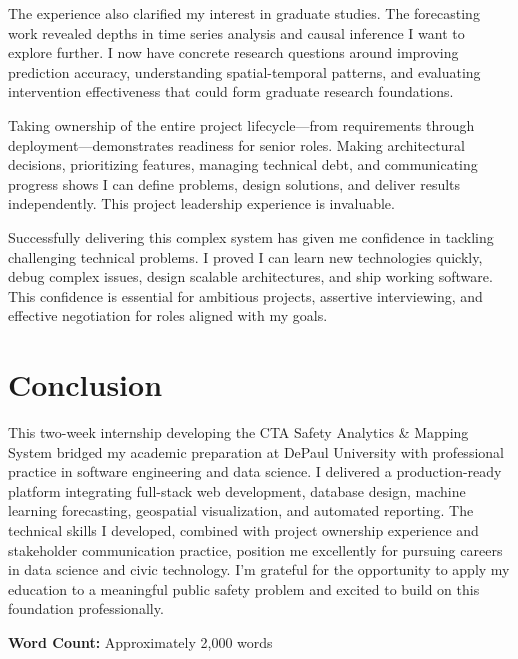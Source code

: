 \documentclass[12pt,letterpaper]{article}
\begin{document}
The experience also clarified my interest in graduate studies. The forecasting work revealed depths in time series analysis and causal inference I want to explore further. I now have concrete research questions around improving prediction accuracy, understanding spatial-temporal patterns, and evaluating intervention effectiveness that could form graduate research foundations.

Taking ownership of the entire project lifecycle---from requirements through deployment---demonstrates readiness for senior roles. Making architectural decisions, prioritizing features, managing technical debt, and communicating progress shows I can define problems, design solutions, and deliver results independently. This project leadership experience is invaluable.

Successfully delivering this complex system has given me confidence in tackling challenging technical problems. I proved I can learn new technologies quickly, debug complex issues, design scalable architectures, and ship working software. This confidence is essential for ambitious projects, assertive interviewing, and effective negotiation for roles aligned with my goals.

\section{Conclusion}

This two-week internship developing the CTA Safety Analytics \& Mapping System bridged my academic preparation at DePaul University with professional practice in software engineering and data science. I delivered a production-ready platform integrating full-stack web development, database design, machine learning forecasting, geospatial visualization, and automated reporting. The technical skills I developed, combined with project ownership experience and stakeholder communication practice, position me excellently for pursuing careers in data science and civic technology. I'm grateful for the opportunity to apply my education to a meaningful public safety problem and excited to build on this foundation professionally.

\vspace{1cm}
\noindent\textbf{Word Count:} Approximately 2,000 words
\end{document}
